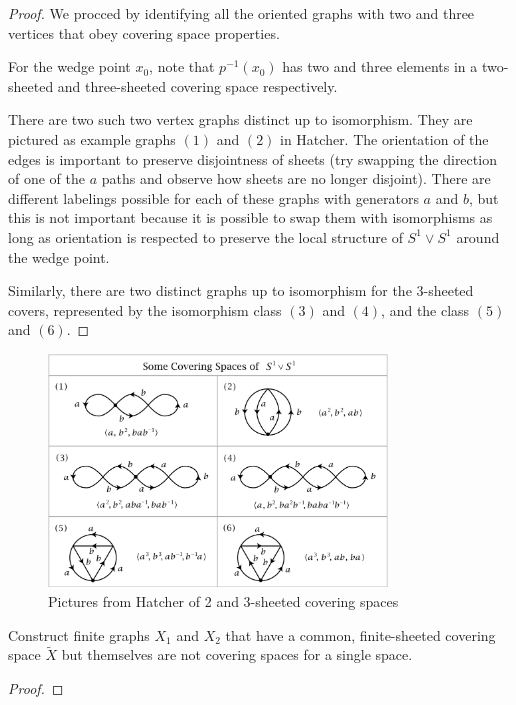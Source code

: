 \documentclass[10pt]{article}
\begin{document}
\begin{proof}
	We procced by identifying all the oriented graphs with two and three vertices
	that obey covering space properties. 

	For the wedge point $x_0$, note that $p^{-1}(x_0)$ has two and
	three elements in a two-sheeted and three-sheeted covering space
	respectively. 

	There are two such two vertex graphs distinct up to isomorphism. They are
	pictured as example graphs $(1)$ and $(2)$ in Hatcher. The orientation of the
	edges is important to preserve disjointness of sheets (try swapping the
	direction of one of the $a$ paths and observe how sheets are no longer
	disjoint). There are different labelings possible for each of these graphs
	with generators $a$ and $b$, but this is not important because it is possible
	to swap them with isomorphisms as long as orientation is respected to
	preserve the local structure of $S^1 \vee S^1$ around the wedge point.

	Similarly, there are two distinct graphs up to isomorphism for the 3-sheeted
	covers, represented by the isomorphism class $(3)$ and $(4)$, and the class
	$(5)$ and $(6)$.
\end{proof}

\begin{figure}[ht!]
\centering
\includegraphics[width=90mm]{example-covers-of-s1-vee-s1.png}
\caption{Pictures from Hatcher of 2 and 3-sheeted covering spaces}
\end{figure}

\begin{exercise}
	Construct finite graphs $X_1$ and $X_2$ that have a common, finite-sheeted
	covering space $\tilde{X}$ but themselves are not covering spaces for a
	single space.
\end{exercise}

\begin{proof}
\end{proof}
\end{document}
